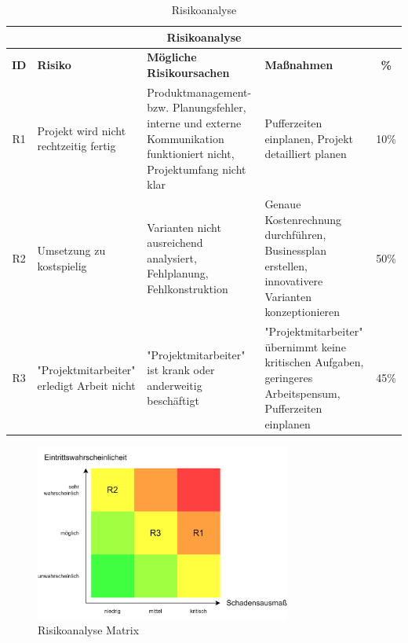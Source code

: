 \begin{table}[H]
  \centering
  \small
  \begin{tabular}{c|p{}|p{}|p{}|c}
    \multicolumn{5}{c}{\textbf{Risikoanalyse}}                                                                                                                                                                                                                                                     \\
    \toprule
    \textbf{ID} & \textbf{Risiko}                       & \textbf{Mögliche Risikoursachen}                                                                                       & \textbf{Maßnahmen}                                                                                & \textbf{\%} \\
    \midrule
    R1          & Projekt wird nicht rechtzeitig fertig & Produktmanagement- bzw. Planungsfehler, interne und externe Kommunikation funktioniert nicht, Projektumfang nicht klar & Pufferzeiten einplanen, Projekt detailliert planen                                                & 10\%        \\ \ghline
    R2          & Umsetzung zu kostspielig              & Varianten nicht ausreichend analysiert, Fehlplanung, Fehlkonstruktion                                                  & Genaue Kostenrechnung durchführen, Businessplan erstellen, innovativere Varianten konzeptionieren & 50\%        \\ \ghline
    R3          & "Projektmitarbeiter" erledigt Arbeit nicht           & "Projektmitarbeiter" ist krank oder anderweitig beschäftigt                                                                           & "Projektmitarbeiter" übernimmt keine kritischen Aufgaben, geringeres Arbeitspensum, Pufferzeiten einplanen       & 45\%        \\
    \bottomrule
  \end{tabular}
  \caption{Risikoanalyse}
  \label{tab:risikoanalyse}
\end{table}

\begin{figure}[H]
  \centering
  \includegraphics[width=0.75\textwidth]{images/risikoanalyse.png}
  \caption{Risikoanalyse Matrix}
  \label{fig:risikoanalyse_matrix}
\end{figure}
